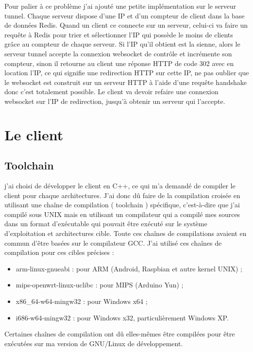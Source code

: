 Pour palier à ce problème j'ai ajouté une petite implémentation sur le
serveur tunnel. Chaque serveur dispose d'une IP et d'un compteur de
client dans la base de données Redis. Quand un client ce connecte sur
un serveur, celui-ci va faire un requête à Redis pour trier et
sélectionner l'IP qui possède le moins de clients grâce au compteur de
chaque serveur. Si l'IP qu'il obtient est la sienne, alors le serveur
tunnel accepte la connexion websocket de contrôle et incrémente son
compteur, sinon il retourne au client une réponse HTTP de code 302
avec en location l'IP, ce qui signifie une redirection HTTP sur cette
IP, ne pas oublier que le websocket est construit sur un serveur HTTP
à l'aide d'une requête handshake donc c'est totalement possible. Le
client va devoir refaire une connexion websocket sur l'IP de
redirection, jusqu'à obtenir un serveur qui l'accepte.

\section{Le client}

\subsection{Toolchain}

j'ai choisi de développer le client en C++, ce qui m'a demandé de
compiler le client pour chaque architectures. J'ai donc dû faire de la
compilation croisée en utilisant une chaîne de compilation (\og
toolchain \fg{}) spécifique, c'est-à-dire que j'ai compilé sous UNIX
mais en utilisant un compilateur qui a compilé mes sources dans un
format d'exécutable qui pouvait être exécuté sur le système
d'exploitation et architectures cible. Toute ces chaînes de
compilations avaient en commun d'être basées sur le compilateur
GCC. J'ai utilisé ces chaînes de compilation pour ces cibles précises :
\begin{itemize}
\item arm-linux-gnueabi : pour ARM (Android, Raspbian et autre kernel
  UNIX) ;
\item mips-openwrt-linux-uclibc : pour MIPS (Arduino Yun) ;
\item x86\_64-w64-mingw32 : pour Windows x64 ;
\item i686-w64-mingw32 : pour Windows x32, particulièrement Windows XP.
\end{itemize}

Certaines chaînes de compilation ont dû elles-mêmes être compilées pour
être exécutées sur ma version de GNU/Linux de développement.

